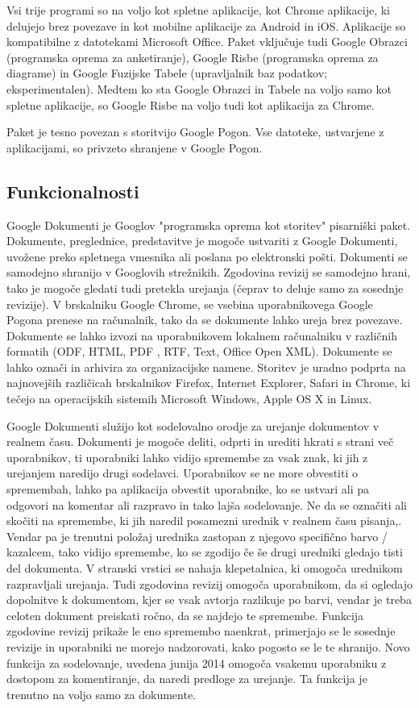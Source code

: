 \documentclass[a4paper, 12pt]{book}
\begin{document}
Vsi trije programi so na voljo kot spletne aplikacije, kot Chrome aplikacije, ki delujejo brez povezave in kot mobilne aplikacije za Android in iOS. Aplikacije so kompatibilne z datotekami Microsoft Office. Paket vključuje tudi Google Obrazci (programska oprema za anketiranje), Google Risbe (programska oprema za diagrame) in Google Fuzijske Tabele (upravljalnik baz podatkov; eksperimentalen). Medtem ko sta Google Obrazci in Tabele na voljo samo kot spletne aplikacije, so Google Risbe na voljo tudi kot aplikacija za Chrome.

Paket je tesno povezan s storitvijo Google Pogon. \cite{52} Vse datoteke, ustvarjene z aplikacijami, so privzeto shranjene v Google Pogon. 

\subsection{Funkcionalnosti}

Google Dokumenti je Googlov "programska oprema kot storitev" pisarniški paket. Dokumente, preglednice, predstavitve je mogoče ustvariti z Google Dokumenti, uvožene preko spletnega vmesnika ali poslana po elektronski pošti. Dokumenti se samodejno shranijo v Googlovih strežnikih. Zgodovina revizij se samodejno hrani, tako je mogoče gledati tudi pretekla urejanja (čeprav to deluje samo za sosednje revizije). V brskalniku Google Chrome, se vsebina uporabnikovega Google Pogona prenese na računalnik, tako da se dokumente lahko ureja brez povezave. \cite{53} Dokumente se lahko izvozi na uporabnikovem lokalnem računalniku v različnih formatih (ODF, HTML, PDF , RTF, Text, Office Open XML). Dokumente se lahko označi in arhivira za organizacijske namene. Storitev je uradno podprta na najnovejših različicah brskalnikov Firefox, Internet Explorer, Safari in Chrome, ki tečejo na operacijskih sistemih Microsoft Windows, Apple OS X in Linux. \cite{54} 

Google Dokumenti služijo kot sodelovalno orodje za urejanje dokumentov v realnem času. Dokumenti je mogoče deliti, odprti in urediti  hkrati s strani več uporabnikov, ti uporabniki lahko vidijo spremembe za vsak znak, ki jih z urejanjem naredijo drugi sodelavci. Uporabnikov se ne more obvestiti o spremembah, lahko pa aplikacija obvestit uporabnike, ko se ustvari ali pa odgovori na komentar ali razpravo in tako lajša sodelovanje. Ne da se označiti ali skočiti na spremembe, ki jih naredil posamezni urednik v realnem času pisanja,. Vendar pa je trenutni položaj urednika zastopan z njegovo specifično barvo / kazalcem, tako vidijo spremembe, ko se zgodijo če še drugi uredniki gledajo tisti del dokumenta. V stranski vrstici se nahaja klepetalnica, ki omogoča urednikom razpravljali urejanja. Tudi zgodovina revizij omogoča uporabnikom, da si ogledajo dopolnitve k dokumentom, kjer se vsak avtorja razlikuje po barvi, vendar je treba celoten dokument preiskati ročno, da se najdejo te spremembe. Funkcija zgodovine revizij prikaže le eno spremembo naenkrat, primerjajo se le sosednje revizije in uporabniki ne morejo nadzorovati, kako pogosto se le te shranijo. Novo funkcija za sodelovanje, uvedena junija 2014 omogoča vsakemu uporabniku z dostopom za komentiranje, da naredi predloge za urejanje. Ta funkcija je trenutno na voljo samo za dokumente. \cite{55} \cite{56} 
\end{document}
